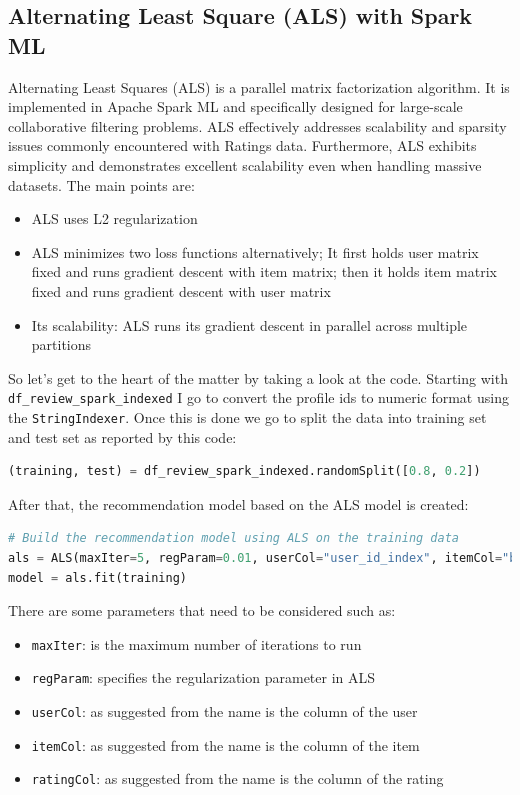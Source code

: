 \documentclass[12pt,english]{report}
\begin{document}
\subsection{Alternating Least Square (ALS) with Spark ML}\label{sec:als}
Alternating Least Squares (ALS) is a parallel matrix factorization algorithm. It is implemented in Apache Spark ML and specifically designed for large-scale collaborative filtering problems. ALS effectively addresses scalability and sparsity issues commonly encountered with Ratings data. Furthermore, ALS exhibits simplicity and demonstrates excellent scalability even when handling massive datasets. The main points are:
\begin{itemize}
\item ALS uses L2 regularization
\item ALS minimizes two loss functions alternatively; It first holds user matrix fixed and runs gradient descent with item matrix; then it holds item matrix fixed and runs gradient descent with user matrix
\item Its scalability: ALS runs its gradient descent in parallel across multiple partitions
\end{itemize}
So let's get to the heart of the matter by taking a look at the code.
Starting with \texttt{df\_review\_spark\_indexed} I go to convert the profile ids to numeric format using the \texttt{StringIndexer}. Once this is done we go to split the data into training set and test set as reported by this code:
\begin{lstlisting}[language={Python},escapechar=|,label={lst:splittraintest},caption={Splitting dataset in training and test set for ALS}]
(training, test) = df_review_spark_indexed.randomSplit([0.8, 0.2])
\end{lstlisting}
After that, the recommendation model based on the ALS model is created:
\begin{lstlisting}[language={Python},escapechar=|,label={lst:splittraintest},caption={Building recommended system model based on the ALS model}]
# Build the recommendation model using ALS on the training data
als = ALS(maxIter=5, regParam=0.01, userCol="user_id_index", itemCol="business_id_index", ratingCol="stars_review")
model = als.fit(training)
\end{lstlisting}
There are some parameters that need to be considered such as:
\begin{itemize}
\item \texttt{maxIter}: is the maximum number of iterations to run
\item \texttt{regParam}: specifies the regularization parameter in ALS
\item \texttt{userCol}: as suggested from the name is the column of the user 
\item \texttt{itemCol}: as suggested from the name is the column of the item 
\item \texttt{ratingCol}: as suggested from the name is the column of the rating 
\end{itemize}
\end{document}
